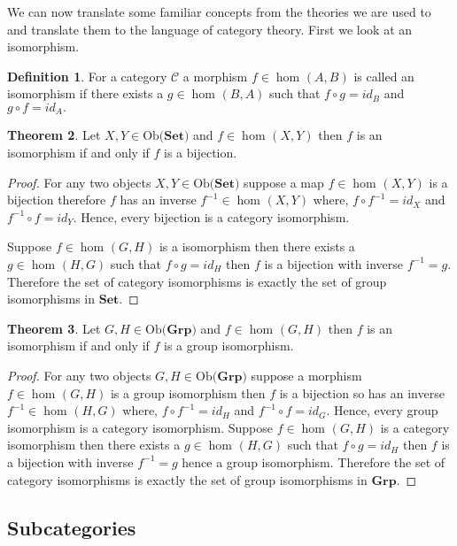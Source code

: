 \documentclass[11pt,a4paper]{article}
\theoremstyle{definition}
\newtheorem{thm}{Theorem}[section]
\newtheorem{definition}[thm]{Definition}
\newcommand\ho[3][]{\hom_{#1}(#2,#3)}
\newcommand\ob[1]{\mathrm{Ob(}#1\mathrm{)}}
\def \jfm{\textcolor{magenta}}
\numberwithin{equation}{section}
\begin{document}
We can now translate some familiar concepts from the theories we are used to and translate them to the language of category theory. First we look at an isomorphism. 
\begin{definition}
\label{def:isomorphism}
For a category $\mathscr{C}$ a morphism $f\in\ho{A}{B}$ is called an isomorphism if there exists a $g\in\ho{B}{A}$ such that $f\circ g = id_{B}$ and $g\circ f = id_{A}.$
\end{definition}
\begin{thm}
Let $X,Y\in\ob{\mathbf{Set}}$ and $f\in\ho{X}{Y}$ then $f$ is an isomorphism if and only if $f$ is a bijection.
\end{thm}
\begin{proof}
For any two objects $X,Y\in\ob{\mathbf{Set}}$ suppose a map $f\in\ho{X}{Y}$ is a bijection therefore $f$ has an inverse $f^{-1}\in\ho{X}{Y}$ where, $f\circ f^{-1} = id_{X}$ and $f^{-1}\circ f = id_{Y}$. Hence, every bijection is a category isomorphism. 

Suppose $f\in\ho{G}{H}$ is a isomorphism then there exists a $g\in\ho{H}{G}$ such that $f\circ g = id_{H}$ then $f$ is a bijection with inverse $f^{-1} = g$. Therefore the set of category isomorphisms is exactly the set of group isomorphisms in $\mathbf{Set}$.
\end{proof}

\begin{thm}
Let $G,H\in\ob{\mathbf{Grp}}$ and $f\in\ho{G}{H}$ then $f$ is an isomorphism if and only if $f$ is a group isomorphism.
\end{thm}
\begin{proof}
For any two objects $G,H\in\ob{\mathbf{Grp}}$ suppose a morphism $f\in\ho{G}{H}$ is a group isomorphism then $f$ is a bijection so has an inverse $f^{-1}\in\ho{H}{G}$ where, $f\circ f^{-1} = id_{H}$ and $f^{-1}\circ f = id_{G}$. Hence, every group isomorphism is a category isomorphism. Suppose $f\in\ho{G}{H}$ is a category isomorphism then there exists a $g\in\ho{H}{G}$ such that $f\circ g = id_{H}$ then $f$ is a bijection with inverse $f^{-1} = g$ hence a group isomorphism. Therefore the set of category isomorphisms is exactly the set of group isomorphisms in $\mathbf{Grp}$.
\end{proof}

\subsection{Subcategories}
\label{ss:subcategories}
\end{document}
